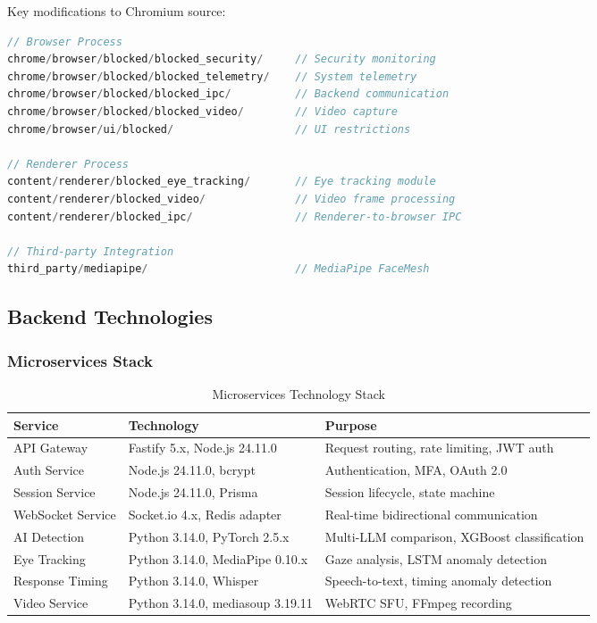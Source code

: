 \documentclass[11pt,letterpaper]{article}
\begin{document}
Key modifications to Chromium source:

\begin{lstlisting}[language=C++, caption=Chromium Modifications]
// Browser Process
chrome/browser/blocked/blocked_security/     // Security monitoring
chrome/browser/blocked/blocked_telemetry/    // System telemetry
chrome/browser/blocked/blocked_ipc/          // Backend communication
chrome/browser/blocked/blocked_video/        // Video capture
chrome/browser/ui/blocked/                   // UI restrictions

// Renderer Process
content/renderer/blocked_eye_tracking/       // Eye tracking module
content/renderer/blocked_video/              // Video frame processing
content/renderer/blocked_ipc/                // Renderer-to-browser IPC

// Third-party Integration
third_party/mediapipe/                       // MediaPipe FaceMesh
\end{lstlisting}

\subsection{Backend Technologies}

\subsubsection{Microservices Stack}

\begin{table}[H]
\centering
\small
\begin{tabularx}{\textwidth}{lXX}
\toprule
\textbf{Service} & \textbf{Technology} & \textbf{Purpose} \\
\midrule
API Gateway & Fastify 5.x, Node.js 24.11.0 & Request routing, rate limiting, JWT auth \\
Auth Service & Node.js 24.11.0, bcrypt & Authentication, MFA, OAuth 2.0 \\
Session Service & Node.js 24.11.0, Prisma & Session lifecycle, state machine \\
WebSocket Service & Socket.io 4.x, Redis adapter & Real-time bidirectional communication \\
AI Detection & Python 3.14.0, PyTorch 2.5.x & Multi-LLM comparison, XGBoost classification \\
Eye Tracking & Python 3.14.0, MediaPipe 0.10.x & Gaze analysis, LSTM anomaly detection \\
Response Timing & Python 3.14.0, Whisper & Speech-to-text, timing anomaly detection \\
Video Service & Python 3.14.0, mediasoup 3.19.11 & WebRTC SFU, FFmpeg recording \\
\bottomrule
\end{tabularx}
\caption{Microservices Technology Stack}
\end{table}
\end{document}
